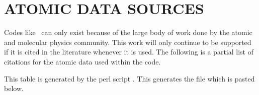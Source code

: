 \chapter{ATOMIC DATA SOURCES}

Codes like \Cloudy\ can only exist because of the large body of work 
done by the atomic and molecular physics community.
This work will only continue
to be supported if it is cited in the literature whenever it is used.
The
following is a partial list of citations for the atomic data used within
the code.

This table is generated by the perl script .
This generates the file 
which is pasted below.

